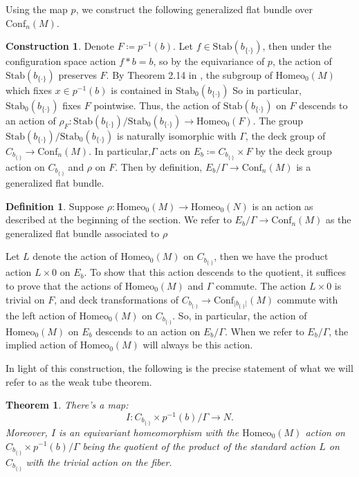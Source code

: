 \documentclass[10pt, oneside]{article}
\newcommand{\homeo}[1][S^1]{\text{Homeo}_0(#1)}
\newcommand{\conf}[2][S^1]{\text{Conf}_{#2}(#1)}
\newcommand{\set}{{\{\cdot\}}}
\newcommand{\stab}[1]{\text{Stab}(#1)}
\newcommand{\pstab}[1]{\text{Stab}_0(#1)}
\newcommand{\maxcov}{C_{b_\set}}
\newtheorem{thm}{Theorem}[section]
\theoremstyle{definition}
\newtheorem{defn}{Definition}[section]
\newtheorem*{construction*}{Construction}
\theoremstyle{definition}
\begin{document}
Using the map $p$, we construct the following generalized flat bundle over $\conf[M]{n}$.

\begin{construction*}\label{const:orbit-bundle}
    Denote $F\coloneqq p^{-1}(b)$.
    Let $f\in\stab{b_\set}$, then under the configuration space action $f*b=b$, so by the equivariance of $p$, the action of $\stab{b_\set}$ preserves $F$.
    By Theorem 2.14 in \cite{chen:StructureTheorems}, the subgroup of $\homeo[M]$ which fixes $x\in p^{-1}(b)$ is contained in $\pstab{b_\set}$
    So in particular, $\pstab{b_\set}$ fixes $F$ pointwise.
    Thus, the action of $\stab{b_\set}$ on $F$ descends to an action of $\rho_F:\stab{b_\set}/\pstab{b_\set}\to \homeo[F]$. The group $\stab{b_\set}/\pstab{b_\set}$ is naturally isomorphic with $\Gamma$, the deck group of $C_{b_\set}\to \conf[M]{n}$.
    In particular,$\Gamma$ acts on $E_b \coloneqq\maxcov\times F$ by the deck group action on $\maxcov$ and $\rho$ on $F$.
    Then by definition, $E_b/\Gamma\to\conf[M]{n}$ is a generalized flat bundle.

    \begin{defn}
        Suppose $\rho:\homeo[M]\to\homeo[N]$ is an action as described at the beginning of the section. We refer to $E_b/\Gamma\to\conf[M]{n}$ as the generalized flat bundle associated to $\rho$
    \end{defn}

    Let $L$ denote the action of $\homeo[M]$ on $\maxcov$, then we have the product action $L\times 0$ on $E_b$. To show that this action descends to the quotient, it suffices to prove that the actions of $\homeo[M]$ and $\Gamma$ commute. The action $L\times 0$ is trivial on $F$, and deck transformations of $\maxcov\to \conf[M]{\lvert b_{\set}\rvert}$ commute with the left action of $\homeo[M]$ on $\maxcov$. So, in particular, the action of $\homeo[M]$ on $E_b$ descends to an action on $E_b/\Gamma$. When we refer to $E_b/\Gamma$, the implied action of $\homeo[M]$ will always be this action.
\end{construction*}

In light of this construction, the following is the precise statement of what we will refer to as the weak tube theorem.

\begin{thm}\label{thm:orbit-bundle}
    There's a map: $$I: \maxcov \times p^{-1}(b)/ \Gamma \to N.$$
    Moreover, $I$ is an equivariant homeomorphism
    with the $\homeo[M]$ action on $\maxcov \times p^{-1}(b) / \Gamma$ being the quotient of the product of the standard action $L$ on $\maxcov$
    with the trivial action on the fiber.
\end{thm}
\end{document}
